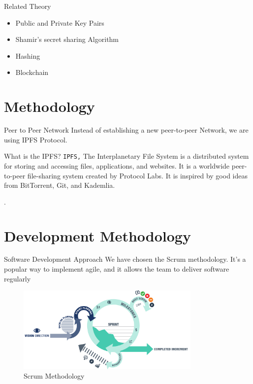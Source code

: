 \documentclass[aspectratio=169,usenames,dvipsnames,pdftex]{beamer}
\begin{document}
  \begin{frame}{Related Theory}
    \begin{itemize}
    \item Public and Private Key Pairs
    \item Shamir’s secret sharing Algorithm
    \item Hashing
    \item Blockchain
    \end{itemize}
  \end{frame}

  \section{Methodology}

  \begin{frame}{Peer to Peer Network}
    Instead of establishing a new peer-to-peer Network, we are using IPFS Protocol.
    \begin{block}{What is the IPFS?}
      \texttt{IPFS,} The Interplanetary File System is a distributed system for storing and accessing files, applications, and websites. It is a worldwide peer-to-peer file-sharing system created by Protocol Labs.  It is inspired by good ideas from BitTorrent, Git, and Kademlia.
    \end{block}.
  \end{frame}

  \section{Development Methodology}

  \begin{frame}{Software Development Approach}
    We have chosen the Scrum methodology. It’s a popular way to implement agile, and it allows the team to deliver software regularly
    \begin{figure}
      \includegraphics[width=0.8\textwidth]{agile-scrum.png}
      \caption{Scrum Methodology}
    \end{figure}
  \end{frame}
\end{document}
